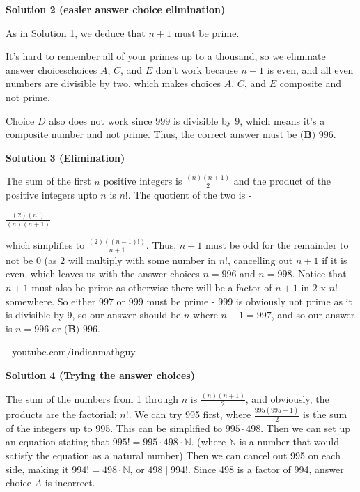 \begin{enumerate}
 



\textbf{Solution 2 (easier answer choice elimination)}

As in Solution 1, we deduce that $n+1$ must be prime. 

 It's hard to remember all of your primes up to a thousand, so we eliminate answer choiceschoices $A$, $C$, and $E$ don't work because $n+1$ is even, and all even numbers are divisible by two, which makes choices $A$, $C$, and $E$ composite and not prime. 

 Choice $D$ also does not work since $999$ is divisible by $9$, which means it's a composite number and not prime. Thus, the correct answer must be $\boxed{\textbf{(B) } 996}$.

 



\textbf{Solution 3 (Elimination)}

The sum of the first $n$ positive integers is $\frac{(n)(n+1)}{2}$ and the product of the positive integers upto $n$ is $n!$. The quotient of the two is -

 $\frac{(2)(n!)}{(n)(n+1)}$

 which simplifies to $\frac{(2)((n-1)!)}{n+1}$. Thus, $n+1$ must be odd for the remainder to not be 0 (as $2$ will multiply with some number in $n!$, cancelling out $n+1$ if it is even, which leaves us with the answer choices $n = 996$ and $n = 998$. Notice that $n + 1$ must also be prime as otherwise there will be a factor of $n + 1$ in $2$ x $n!$ somewhere. So either $997$ or $999$ must be prime - $999$ is obviously not prime as it is divisible by 9, so our answer should be $n$ where $n + 1 = 997$, and so our answer is $n = 996$ or $\boxed{\textbf{(B) } 996}$.

 - youtube.com/indianmathguy

 



\textbf{Solution 4 (Trying the answer choices)}

The sum of the numbers from 1 through $n$ is $\frac{(n)(n+1)}{2}$, and obviously, the products are the factorial; $n!$. We can try 995 first, where $\frac{995(995+1)}{2}$ is the sum of the integers up to 995. This can be simplified to $995 \cdot 498$. Then we can set up an equation stating that $995! = 995 \cdot 498 \cdot \mathbb{N}$. (where $\mathbb{N}$ is a number that would satisfy the equation as a natural number) Then we can cancel out 995 on each side, making it $994! = 498 \cdot \mathbb{N}$, or $498 \mid 994!$. Since 498 is a factor of 994, answer choice $A$ is incorrect. 


\end{enumerate}
